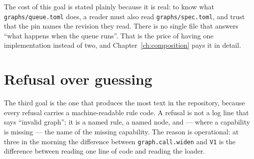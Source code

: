 \begin{center}

\end{center}

The cost of this goal is stated plainly because it is real: to know what \texttt{graphs/queue.toml}
does, a reader must also read \texttt{graphs/spec.toml}, and trust that the pin names the revision
they read. There is no single file that answers \enquote{what happens when the queue runs}. That is
the price of having one implementation instead of two, and Chapter~\ref{ch:composition} pays it in
detail.

\section{Refusal over guessing}

The third goal is the one that produces the most text in the repository, because every refusal
carries a machine-readable rule code. A refusal is not a log line that says \enquote{invalid graph};
it is a named rule, a named node, and --- where a capability is missing --- the name of the missing
capability. The reason is operational: at three in the morning the difference between
\texttt{graph.call.widen} and \texttt{V1} is the difference between reading one line of code and
reading the loader.

